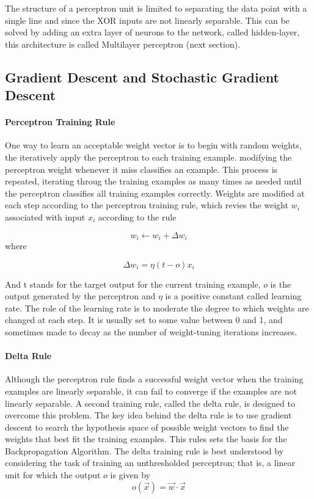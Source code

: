 \documentclass{tufte-handout}
\begin{document}
The structure of a perceptron unit is limited to separating the data point with a single line and since the XOR inputs are not linearly separable. This can be solved by adding an extra layer of neurons to the network, called hidden-layer, this architecture is called Multilayer perceptron (next section). 
    

\subsection{Gradient Descent and Stochastic Gradient Descent}
\paragraph{Perceptron Training Rule}
One way to learn an acceptable weight vector is to begin with random weights, the  iteratively apply the perceptron to each training example. modifying the perceptron weight whenever it miss classifies an example. This process is repeated, iterating throug the training examples as many times as needed until the perceptron classifies all training examples correctly. Weights are modified at each step according to the perceptron training rule, which revies the weight $w_i$ associated with input $x_i$ according to the rule

\begin{equation}
    w_i \leftarrow w_i + \Delta w_i
\end{equation}
where

\begin{equation}
    \Delta w_i = \eta (t - o)x_i
\end{equation}

And t stands for the target output for the current training example, $o$ is the output generated by the perceptron and $\eta$ is a positive constant called learning rate. The role of the learning rate is to moderate the degree to which weights are changed at each step. It is usually set to some value between 0 and 1, and sometimes made to decay as the number of weight-tuning iterations increases.

\paragraph{Delta Rule}
Although the perceptron rule finds a successful weight vector when the training examples are linearly separable, it can fail to converge if the examples are not linearly separable. A second training rule, called the delta rule, is designed to overcome this problem.
The key idea behind the delta rule is to use gradient descent to search the hypothesis space of possible weight vectors to find the weights that best fit the training examples. This rules sets the basis for the Backpropagation Algorithm.
The delta training rule is best understood by considering the task of training an unthresholded perceptron; that is, a linear unit for which the output $o$ is given by
\begin{equation}
    o(\Vec{x}) = \Vec{w} \cdot \Vec{x}
\end{equation}
\end{document}
